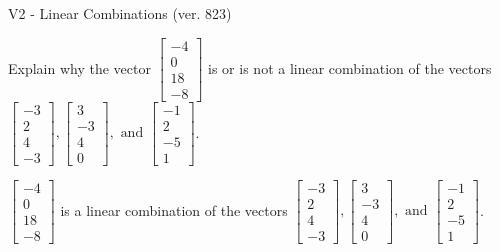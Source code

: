 \begin{exercise}
  \begin{exerciseTitle}V2 - Linear Combinations (ver. 823)\end{exerciseTitle}
  \begin{exerciseStatement}
    Explain why the vector \(\left[\begin{array}{c}
-4 \\
0 \\
18 \\
-8
\end{array}\right]\)  is or is not a linear 
	combination of the vectors \(\left[\begin{array}{c}
-3 \\
2 \\
4 \\
-3
\end{array}\right] , \left[\begin{array}{c}
3 \\
-3 \\
4 \\
0
\end{array}\right] , \text{ and } \left[\begin{array}{c}
-1 \\
2 \\
-5 \\
1
\end{array}\right]\).
	


  \end{exerciseStatement}
  \begin{exerciseAnswer}
   \(\left[\begin{array}{c}
-4 \\
0 \\
18 \\
-8
\end{array}\right]\) 
  	 is  
	a linear combination of the vectors \(\left[\begin{array}{c}
-3 \\
2 \\
4 \\
-3
\end{array}\right] , \left[\begin{array}{c}
3 \\
-3 \\
4 \\
0
\end{array}\right] , \text{ and } \left[\begin{array}{c}
-1 \\
2 \\
-5 \\
1
\end{array}\right]\).

	
  


  \end{exerciseAnswer}
\end{exercise}